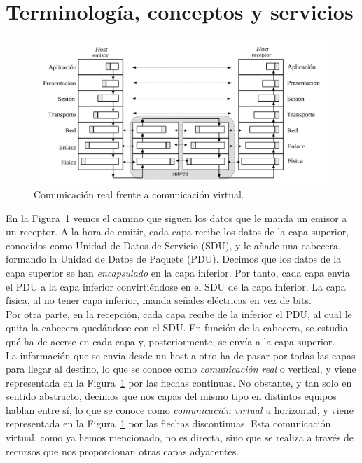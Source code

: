 \section{Terminología, conceptos y servicios}

\begin{figure}
    \centering
    \includegraphics[width=0.8\linewidth]{./images/comunicacionHosts.png}
    \caption{Comunicación real frente a comunicación virtual.}
    \label{fig:comHosts}
\end{figure}

En la Figura~\ref{fig:comHosts} vemos el camino que siguen los datos que le manda un emisor a un receptor. A la hora de emitir, cada capa recibe los datos de la capa superior, conocidos como Unidad de Datos de Servicio (\acrfull{SDU}), y le añade una cabecera, formando la Unidad de Datos de Paquete (\acrfull{PDU}). Decimos que los datos de la capa superior se han \emph{encapsulado} en la capa inferior. Por tanto, cada capa envía el \acrshort{PDU} a la capa inferior convirtiéndose en el \acrshort{SDU} de la capa inferior. La capa física, al no tener capa inferior, manda señales eléctricas en vez de bits. \\

Por otra parte, en la recepción, cada capa recibe de la inferior el \acrshort{PDU}, al cual le quita la cabecera quedándose con el \acrshort{SDU}. En función de la cabecera, se estudia qué ha de acerse en cada capa y, posteriormente, se envía a la capa superior.\\

La información que se envía desde un host a otro ha de pasar por todas las capas para llegar al destino, lo que se conoce como \emph{comunicación real} o vertical, y viene representada en la Figura~\ref{fig:comHosts} por las flechas continuas. No obstante, y tan solo en sentido abstracto, decimos que nos capas del mismo tipo en distintos equipos hablan entre sí, lo que se conoce como \emph{comunicación virtual} u horizontal, y viene representada en la Figura~\ref{fig:comHosts} por las flechas discontinuas. Esta comunicación virtual, como ya hemos mencionado, no es directa, sino que se realiza a través de recursos que nos proporcionan otras capas adyacentes.\\

